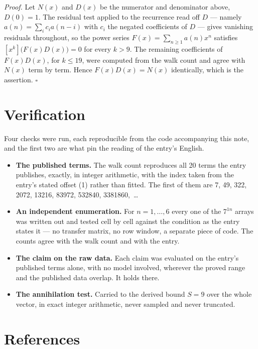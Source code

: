 \documentclass[11pt]{article}
\theoremstyle{definition}
\begin{document}
{\itshape Proof.} Let $N(x)$ and $D(x)$ be the numerator and denominator above, $D(0)=1$. The residual test applied to the recurrence read off $D$ --- namely $a(n) = \sum_i c_i a(n-i)$ with $c_i$ the negated coefficients of $D$ --- gives vanishing residuals throughout, so the power series $F(x)=\sum_{n\ge 1}a(n)x^n$ satisfies $[x^k]\bigl(F(x)D(x)\bigr) = 0$ for every $k > 9$. The remaining coefficients of $F(x)D(x)$, for $k \le 19$, were computed from the walk count and agree with $N(x)$ term by term. Hence $F(x)D(x) = N(x)$ identically, which is the assertion. $\square$

\section{Verification}

Four checks were run, each reproducible from the code accompanying this note, and the first two are what pin the reading of the entry's English.

\begin{itemize}

\item {\bfseries The published terms.} The walk count reproduces all 20 terms the entry publishes, exactly, in integer arithmetic, with the index taken from the entry's stated offset (1) rather than fitted. The first of them are 7, 49, 322, 2072, 13216, 83972, 532840, 3381860,~\dots

\item {\bfseries An independent enumeration.} For $n = 1,\dots,6$ every one of the $7^{1n}$ arrays was written out and tested cell by cell against the condition as the entry states it --- no transfer matrix, no row window, a separate piece of code. The counts agree with the walk count and with the entry.

\item {\bfseries The claim on the raw data.} Each claim was evaluated on the entry's published terms alone, with no model involved, wherever the proved range and the published data overlap. It holds there.

\item {\bfseries The annihilation test.} Carried to the derived bound $S = 9$ over the whole vector, in exact integer arithmetic, never sampled and never truncated.

\end{itemize}

\section{References}
\end{document}

